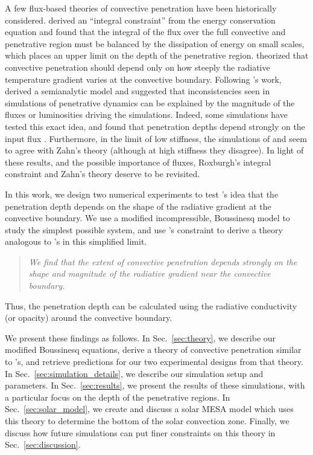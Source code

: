 \documentclass{aastex631}
\begin{document}
A few flux-based theories of convective penetration have been historically considered.
\citet{roxburgh1978, roxburgh1989, roxburgh1992, roxburgh1998} derived an ``integral constraint'' from the energy conservation equation and found that the integral of the flux over the full convective and penetrative region must be balanced by the dissipation of energy on small scales, which places an upper limit on the depth of the penetrative region.
\citet{zahn1991} theorized that convective penetration should depend only on how steeply the radiative temperature gradient varies at the convective boundary.
Following \citet{zahn1991}'s work, \citet{rempel2004} derived a semianalytic model and suggested that inconsistencies seen in simulations of penetrative dynamics can be explained by the magnitude of the fluxes or luminosities driving the simulations.
Indeed, some simulations have tested this exact idea, and found that penetration depths depend strongly on the input flux \citep{singh_etal_1998, kapyla_etal_2007, tian_etal_2009, hotta2017, kapyla2019}.
Furthermore, in the limit of low stiffness, the simulations of \citet{hurlburt_etal_1994} and \citet{rogers_etal_2006} seem to agree with Zahn's theory (although at high stiffness they disagree).
In light of these results, and the possible importance of fluxes, Roxburgh's integral constraint and Zahn's theory deserve to be revisited.

In this work, we design two numerical experiments to test \citet{zahn1991}'s idea that the penetration depth depends on the shape of the radiative gradient at the convective boundary.
We use a modified incompressible, Boussinesq model to study the simplest possible system, and use \citet{roxburgh1989}'s constraint to derive a theory analogous to \citet{zahn1991}'s in this simplified limit.
\begin{quote}
\emph{
We find that the extent of convective penetration depends strongly on the shape and magnitude of the radiative gradient near the convective boundary.
}
\end{quote}
Thus, the penetration depth can be calculated using the radiative conductivity (or opacity) around the convective boundary.

We present these findings as follows.
In Sec.~\ref{sec:theory}, we describe our modified Boussinesq equations, derive a theory of convective penetration similar to \citet{zahn1991}'s, and retrieve predictions for our two experimental designs from that theory.
In Sec.~\ref{sec:simulation_details}, we describe our simulation setup and parameters.
In Sec.~\ref{sec:results}, we present the results of these simulations, with a particular focus on the depth of the penetrative regions.
In Sec.~\ref{sec:solar_model}, we create and discuss a solar MESA model which uses this theory to determine the bottom of the solar convection zone.
Finally, we discuss how future simulations can put finer constraints on this theory in Sec.~\ref{sec:discussion}.
\end{document}
